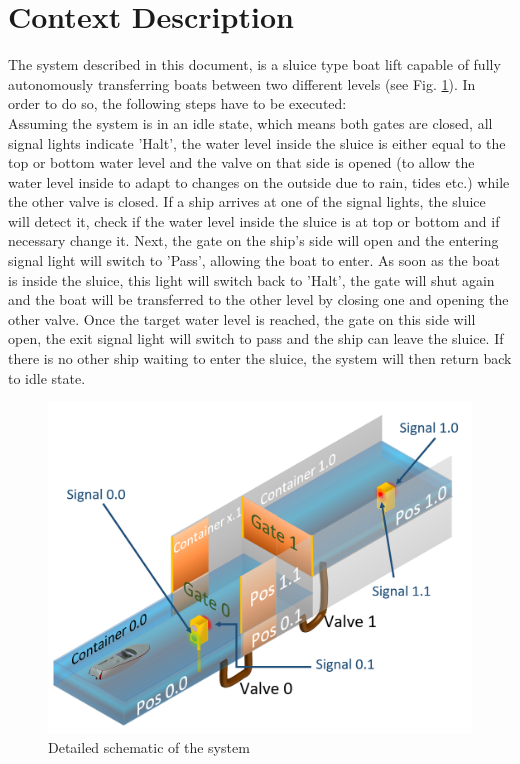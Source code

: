 \section{Context Description}
The system described in this document, is a sluice type boat lift capable of fully autonomously transferring boats between two different levels (see Fig. \ref{fig:boat1}). In order to do so, the following steps have to be executed:\\ 

\noindent Assuming the system is in an idle state, which means both gates are closed, all signal lights indicate 'Halt', the water level inside the sluice is either equal to the top or bottom water level and the valve on that side is opened (to allow the water level inside to adapt to changes on the outside due to rain, tides etc.) while the other valve is closed. If a ship arrives at one of the signal lights, the sluice will detect it, check if the water level inside the sluice is at top or bottom and if necessary change it. Next, the gate on the ship's side will open and the entering signal light will switch to 'Pass', allowing the boat to enter. As soon as the boat is inside the sluice, this light will switch back to 'Halt', the gate will shut again and the boat will be transferred to the other level by closing one and opening the other valve. Once the target water level is reached, the gate on this side will open, the exit signal light will switch to pass and the ship can leave the sluice. If there is no other ship waiting to enter the sluice, the system will then return back to idle state.

\begin{figure}[!h]
	\includegraphics[width=\linewidth]{PictureName10}
	\caption{Detailed schematic of the system}
	\label{fig:boat1}
\end{figure}